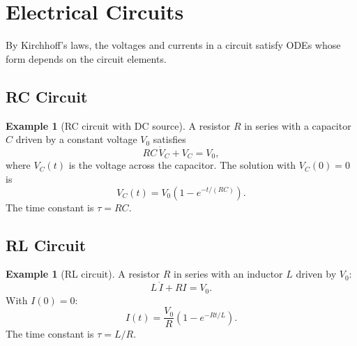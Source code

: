 \documentclass[12pt,a4paper,openany]{book}
\theoremstyle{definition}
\newtheorem{example}[definition]{Example}
\theoremstyle{plain}
\theoremstyle{remark}
\begin{document}
\section{Electrical Circuits}
\label{sec:circuits}

By Kirchhoff's laws, the voltages and
currents in a circuit satisfy ODEs whose form depends on the circuit
elements.

\subsection{RC Circuit}
\label{subsec:RC}

\begin{example}[RC circuit with DC source]
\label{ex:RC-circuit}
A resistor $R$ in series with a capacitor $C$ driven by a constant
voltage $V_{0}$ satisfies
\[
  RC\,\dot{V}_{C} + V_{C} = V_{0},
\]
where $V_{C}(t)$ is the voltage across the capacitor. The solution
with $V_{C}(0)=0$ is
\[
  V_{C}(t) = V_{0}\!\left(1-e^{-t/(RC)}\right).
\]
The time constant is $\tau=RC$.
\end{example}

\begin{center}
\end{center}

\subsection{RL Circuit}
\label{subsec:RL}

\begin{example}[RL circuit]
\label{ex:RL-circuit}
A resistor $R$ in series with an inductor $L$ driven by $V_{0}$:
\[
  L\,\dot{I} + RI = V_{0}.
\]
With $I(0)=0$:
\[
  I(t) = \frac{V_{0}}{R}\!\left(1-e^{-Rt/L}\right).
\]
The time constant is $\tau=L/R$.
\end{example}
\end{document}
